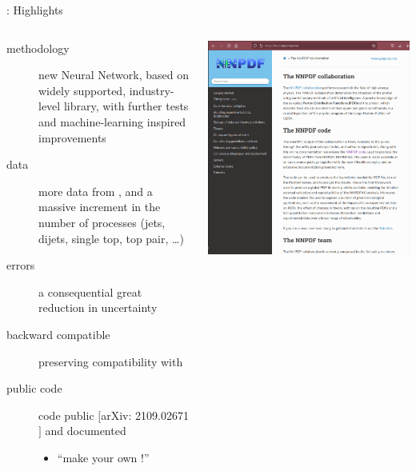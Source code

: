 \documentclass[9pt]{beamer}
\providecommand{\iRef}[1]{{\color{mLightGreen}\small $[$#1$]$}}
\begin{document}
\begin{frame}{: Highlights}
    \begin{columns}
        \begin{column}{0.4\textwidth}
            \begin{description}
                \item[methodology] new Neural Network, based on widely
                    supported, industry-level library, with further tests and
                    machine-learning inspired improvements
                \item[data] more data from \lhc, and a massive increment in the
                    number of processes (jets, dijets, single top, top pair,
                    \dots)
                \item[errors] a consequential great reduction in uncertainty
                \item[backward compatible] preserving compatibility with
                \item[public code] code public \iRef{arXiv: 2109.02671} and
                    documented
                \begin{itemize}
                    \item \enquote{make your own \nnpdf{}!}
                \end{itemize}
            \end{description}
        \end{column}
        \begin{column}{0.5\textwidth}
            \begin{center}
                \includegraphics[width=1.1\textwidth]{nnpdf-docs}
            \end{center}
        \end{column}
    \end{columns}
\end{frame}
\end{document}
